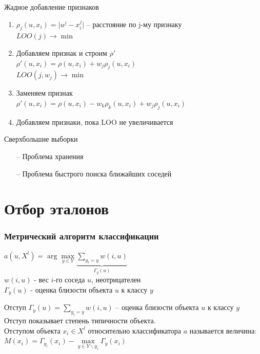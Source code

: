 \documentclass[10pt]{beamer}
\begin{document}
\begin{frame}{Жадное добавление признаков}
	\begin{enumerate} [<+->]
		\item ${\rho_j(u, x_i) = \vert u^j - x_i^j \vert}$ -- расстояние по j-му признаку\\
		          $LOO(j) \rightarrow \min$\\
		\item Добавляем признак и строим $\rho'$\\
							${\rho'(u, x_i) = \rho(u, x_i) + w_j\rho_j(u, x_i)}$\\
							$LOO(j, w_j) \rightarrow \min$\\
		\item Заменяем признак\\
            		${\rho'(u, x_i) = \rho(u, x_i) - w_k\rho_k(u, x_i) + w_j\rho_j(u, x_i)}$\\
		\item Добавляем признаки, пока LOO не увеличивается
	\end{enumerate}
\end{frame}

\begin{frame}{Сверхбольшие выборки}
	\begin{itemize} [<+- | alert@+>]
		\item[--] Проблема хранения
		\item[--] Проблема быстрого поиска ближайших соседей
	\end{itemize}
\end{frame}

\section{Отбор эталонов}

\begin{frame}\frametitle{Метрический алгоритм классификации}
	${a(u, X^l) = \arg\max\limits_{y \in Y} \underbrace{\sum\limits_{y_i = y} w(i, u)}_{\Gamma_y(u)} }$\\
	\bigbreak
	$w(i, u)$ - вес $i$-го соседа $u$, неотрицателен\\
	$\Gamma_y(u)$ - оценка близости объекта $u$ к классу ${y}$
\end{frame}

\begin{frame}{Отступ}
	${\Gamma_y(u) = \sum\limits_{y_i = y} w(i, u)}$ -- оценка близости объекта $u$ к классу ${y}$\\
	\bigbreak
	Отступ показывает степень \alert{типичности объекта}.\\
	\bigbreak
	\alert{Отступом} объекта ${x_i \in X^l}$ относительно классификатора $a$ называется величина:\\
	\bigbreak
	\centering	
  ${M(x_i) = \Gamma_{y_i}(x_i) - \max\limits_{y \in Y\backslash y_i} \Gamma_y(x_i)}$

\end{frame}
\end{document}
